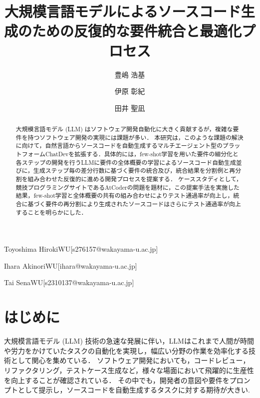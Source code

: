\documentclass[submit,techrep,noauthor]{ipsj}
\begin{document}
\title{大規模言語モデルによるソースコード生成のための反復的な要件統合と最適化プロセス}



\author{豊嶋 浩基}{Toyoshima Hiroki}{WU}[s276157@wakayama-u.ac.jp]
\author{伊原 彰紀}{Ihara Akinori}{WU}[ihara@wakayama-u.ac.jp]
\author{田井 聖凪}{Tai Sena}{WU}[s2310137@wakayama-u.ac.jp]

\begin{abstract}
大規模言語モデル (LLM) はソフトウェア開発自動化に大きく貢献するが，複雑な要件を持つソフトウェア開発の実現には課題が多い．
本研究は，このような課題の解決に向けて，自然言語からソースコードを自動生成するマルチエージェント型のプラットフォームChatDevを拡張する．具体的には，few-shot学習を用いた要件の細分化と各ステップの開発を行うLLMに要件の全体概要の学習によるソースコード自動生成並びに，生成ステップ毎の差分行数に基づく要件の統合及び，統合結果を分割例と再分割を組み合わせた反復的に進める開発プロセスを提案する．
ケーススタディとして，競技プログラミングサイトであるAtCoderの問題を題材に，この提案手法を実施した結果，few-shot学習と全体概要の共有の組み合わせによりテスト通過率が向上し，統合に基づく要件の再分割により生成されたソースコードはさらにテスト通過率が向上することを明らかにした．

\end{abstract}

\maketitle

\section{はじめに}

大規模言語モデル (LLM) 技術の急速な発展に伴い\cite{Growing_LLM}，LLMはこれまで人間が時間や労力をかけていたタスクの自動化を実現し，幅広い分野の作業を効率化する技術として関心を集めている．
ソフトウェア開発においても，コードレビュー，リファクタリング，テストケース生成など，様々な場面において飛躍的に生産性を向上することが確認されている\cite{LLM_CodeReview}\cite{LLM_Refactoring}\cite{LLM_Gene_Test}．
その中でも，開発者の意図や要件をプロンプトとして提示し，ソースコードを自動生成するタスクに対する期待が大きい\cite{LLM_CodeGeneration}.
\end{document}

